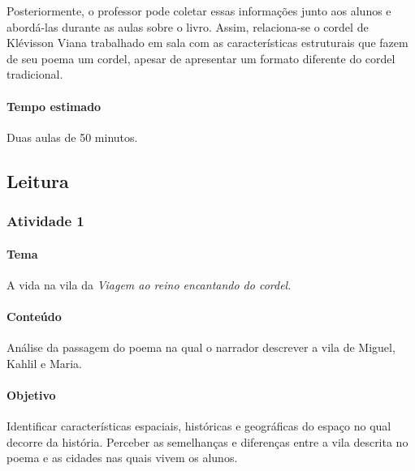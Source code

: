 \documentclass[11pt]{extarticle}
\begin{document}
Posteriormente, o professor pode coletar essas informações junto aos alunos e abordá-las durante as aulas sobre o livro. Assim, relaciona-se o cordel de Klévisson Viana trabalhado em sala com as características estruturais que fazem de seu poema um cordel, apesar de apresentar um formato diferente do cordel tradicional.


\paragraph{Tempo estimado} Duas aulas de 50 minutos.


\subsection{Leitura}

\subsubsection{Atividade 1}


\paragraph{Tema} A vida na vila da \textit{Viagem ao reino encantando do cordel}.

\paragraph{Conteúdo} Análise da passagem do poema na qual o narrador descrever a vila de Miguel, Kahlil e Maria.

\paragraph{Objetivo} Identificar características espaciais, históricas e geográficas do espaço no qual decorre da história. Perceber as semelhanças e diferenças entre a vila descrita no poema e as cidades nas quais vivem os alunos.
\end{document}
